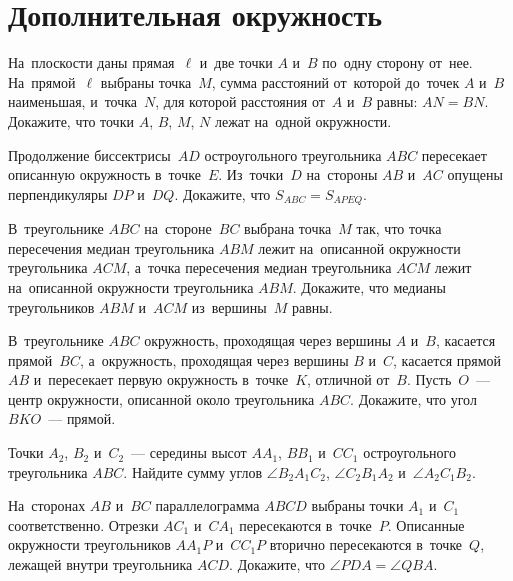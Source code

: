 
\section*{Дополнительная окружность}



\begin{problems}

\item
На~плоскости даны прямая~$\ell$ и~две точки $A$ и~$B$ по~одну сторону от~нее.
На~прямой~$\ell$ выбраны точка~$M$, сумма расстояний от~которой
до~точек $A$ и~$B$ наименьшая, и~точка~$N$, для которой расстояния
от~$A$ и~$B$ равны: $AN = BN$.
Докажите, что точки $A$, $B$, $M$, $N$ лежат на~одной окружности.

\item
Продолжение биссектрисы~$AD$ остроугольного треугольника $ABC$ пересекает
описанную окружность в~точке~$E$.
Из~точки~$D$ на~стороны $AB$ и~$AC$ опущены перпендикуляры $DP$ и~$DQ$.
Докажите, что $S_{ABC}= S_{APEQ}$.

\item
В~треугольнике $ABC$ на~стороне~$BC$ выбрана точка~$M$ так, что точка
пересечения медиан треугольника $ABM$ лежит на~описанной окружности
треугольника $ACM$, а~точка пересечения медиан треугольника $ACM$ лежит
на~описанной окружности треугольника $ABM$.
Докажите, что медианы треугольников $ABM$ и~$ACM$ из~вершины~$M$ равны.

\item
В~треугольнике $ABC$ окружность, проходящая через вершины $A$ и~$B$, касается
прямой~$BC$, а~окружность, проходящая через вершины $B$ и~$C$, касается
прямой~$AB$ и~пересекает первую окружность в~точке~$K$, отличной от~$B$.
Пусть~$O$~— центр окружности, описанной около треугольника $ABC$.
Докажите, что угол $BKO$~— прямой.

\item
Точки $A_2$, $B_2$ и~$C_2$~— середины высот $A A_1$, $B B_1$ и~$C C_1$
остроугольного треугольника $ABC$.
Найдите сумму углов
$\angle B_2 A_1 C_2$, $\angle C_2 B_1 A_2$ и~$\angle A_2 C_1 B_2$.

\item
На~сторонах $AB$ и~$BC$ параллелограмма $ABCD$ выбраны точки $A_1$ и~$C_1$
соответственно.
Отрезки $A C_1$ и~$C A_1$ пересекаются в~точке~$P$.
Описанные окружности треугольников $A A_1 P$ и~$C C_1 P$ вторично пересекаются
в~точке~$Q$, лежащей внутри треугольника $ACD$.
Докажите, что $\angle PDA = \angle QBA$.


\end{problems}
